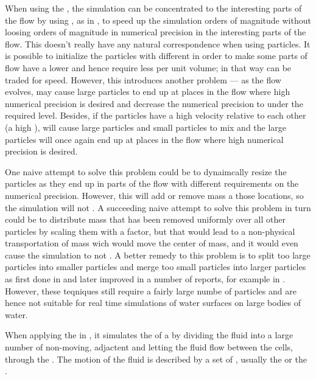 When using the \FVM, the simulation can be concentrated to the interesting parts of the flow by using , as in \citep{Popinet2003,Losasso2004}, to speed up the simulation orders of magnitude without loosing orders of magnitude in numerical precision in the interesting parts of the flow. This doesn't really have any natural correspondence when using particles. It is possible to initialize the particles with different  %
in order to make some parts of flow have a lower  and hence require less  per unit volume; in that way  can be traded for speed. However, this introduces another problem --- as the flow evolves, \advection may cause large particles to end up at places in the flow where high numerical precision is desired and decrease the numerical precision to under the required level. Besides, if the particles have a high velocity relative to each other (a high \temperature), \diffusion will cause large particles and small particles to mix and the large particles will once again end up at places in the flow where high numerical precision is desired.

One naive attempt to solve this problem could be to dynaimcally resize the particles as they end up in parts of the flow with different requirements on the numerical precision. However, this will add or remove mass a those locations, so the simulation will not . A succeeding naive attempt to solve this problem in turn could be to distribute mass that has been removed uniformly over all other particles by scaling them with a factor, but that would lead to a non-physical transportation of mass wich would move the center of mass, and it would even cause the simulation to not . A better remedy to this problem is to split too large particles into smaller particles and merge too small particles into larger particles as first done in \citep{Desbrun1999} and later improved in a number of reports, for example in \citep{Yan2009}. However, these teqniques still require a fairly large numbe of particles and are hence not suitable for real time simulations of water surfaces on large bodies of water.

When applying the \FVM in \CFD, it simulates the \flow of a \fluid by dividing the fluid into a large number of non-moving, adjactent \cells and letting the fluid flow between the cells, through the . The motion of the fluid is described by a set of \PDEs, usually the  or the .

